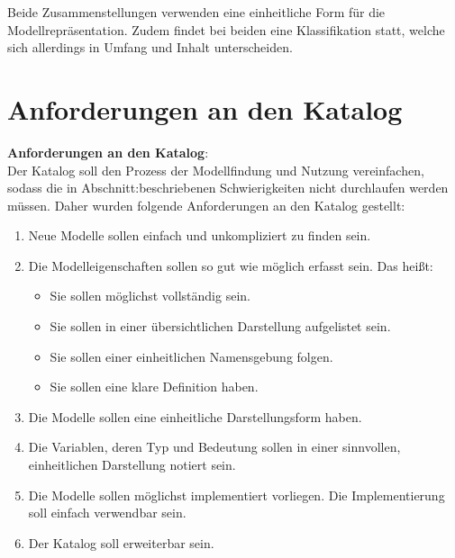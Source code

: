 Beide Zusammenstellungen verwenden eine einheitliche Form für die Modellrepräsentation. Zudem findet bei beiden eine Klassifikation statt, welche sich allerdings in Umfang und Inhalt unterscheiden.
\section{Anforderungen an den Katalog} %
\label{Ch:Vorbetrachtung:Sec:Anforderungen}
\textbf{Anforderungen an den Katalog}:\\ %
Der Katalog soll den Prozess der Modellfindung und Nutzung vereinfachen, sodass die in Abschnitt:\glqq {}\grqq beschriebenen Schwierigkeiten nicht durchlaufen werden müssen. Daher wurden folgende Anforderungen an den Katalog gestellt:
\begin{enumerate}[label=\textbf{Anforderung A.\arabic*}:, ref=\textbf{A.\arabic*}, wide=0pt, leftmargin=*]
	\item \label{A.Findbarkeit}Neue Modelle sollen einfach und unkompliziert zu finden sein.
	\item \label{A.Modelleigenschaften}Die Modelleigenschaften sollen so gut wie möglich erfasst sein. Das heißt:
	\begin{itemize}[label=$\bullet$]
		\item Sie sollen möglichst vollständig sein.
		\item Sie sollen in einer übersichtlichen Darstellung aufgelistet sein.
		\item Sie sollen einer einheitlichen Namensgebung folgen.
		\item Sie sollen eine klare Definition haben.
	\end{itemize}
	\item \label{A.Darstellung_Gleichungen}Die Modelle sollen eine einheitliche Darstellungsform haben.
	\item \label{A.Darstellung_Variablen}Die Variablen, deren Typ und Bedeutung sollen in einer sinnvollen, einheitlichen Darstellung notiert sein.
	\item \label{A.Implementierung}Die Modelle sollen möglichst implementiert vorliegen. Die Implementierung soll einfach verwendbar sein.
	\item \label{A.Erweiterbarkeit}Der Katalog soll erweiterbar sein. %
\end{enumerate}

